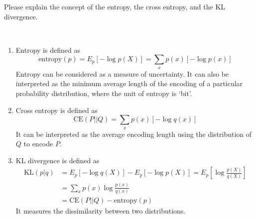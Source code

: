 \begin{exercise}[]{Please explain the concept of the entropy, the cross entropy, and the KL divergence.}
  \begin{solution}
  \par{~}
  \begin{enumerate}
    \item Entropy is defined as
    \begin{equation}
      \text{entropy}(p) = E_p [-\log p(X)] = \sum_{x} p(x) [-\log p(x)]
    \end{equation}
    Entropy can be considered as a measure of uncertainty. It can also be interpreted as the minimum average length of the encoding of a particular probability distribution, where the unit of entropy is `bit'.
    \item Cross entropy is defined as
    \begin{equation}
      \text{CE}(P||Q) = \sum_{x} p(x) [-\log q(x)]
    \end{equation}
    It can be interpreted as the average encoding length using the distribution of $Q$ to encode $P$.
    \item KL divergence is defined as
    \begin{equation}
      \begin{aligned}
        \text{KL}(p|q) &= E_p [-\log q(X)] - E_p [-\log p(X)] = E_p[\log\frac{p(X)}{q(X)} ] \\
        &= \sum_{x} p(x) \log\frac{p(x)}{q(x)} \\
        &= \text{CE}(P||Q) - \text{entropy}(p)
      \end{aligned}
    \end{equation}
    It measures the dissimilarity between two distributions.
  \end{enumerate}
  \end{solution}
  \label{ex1}
\end{exercise}


